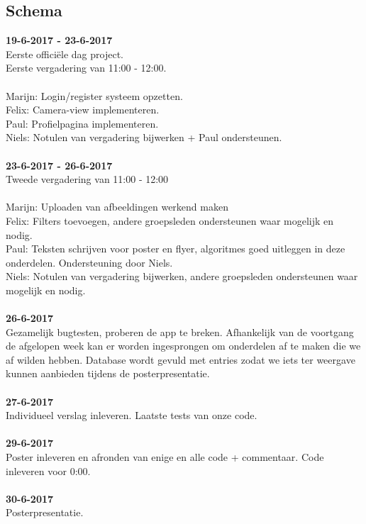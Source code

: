 \documentclass{uva-inf-article}
\begin{document}
\subsection{Schema}
\textbf{19-6-2017 - 23-6-2017}\\
Eerste offici\"ele dag project.\\
Eerste vergadering van 11:00 - 12:00.\\\\
Marijn: \space\space Login/register systeem opzetten.\\
Felix: \space\space\space\space Camera-view implementeren.\\
Paul: \space\space\space\space Profielpagina implementeren.\\
Niels: \space\space\space\space Notulen van vergadering bijwerken + Paul ondersteunen.\\
\\
\noindent
\textbf{23-6-2017 - 26-6-2017}\\
Tweede vergadering van 11:00 - 12:00\\\\
Marijn: \space\space Uploaden van afbeeldingen werkend maken\\
Felix: \space\space\space\space Filters toevoegen, andere groepsleden ondersteunen waar mogelijk en nodig.\\
Paul: \space\space\space\space Teksten schrijven voor poster en flyer, algoritmes goed uitleggen in deze onderdelen. Ondersteuning door Niels.\\
Niels: \space\space\space\space Notulen van vergadering bijwerken, andere groepsleden ondersteunen waar mogelijk en nodig.\\
\\
\noindent
\textbf{26-6-2017}\\
Gezamelijk bugtesten, proberen de app te breken. Afhankelijk van de voortgang de afgelopen week kan er worden ingesprongen om onderdelen af te maken die we af wilden hebben. Database wordt gevuld met entries zodat we iets ter weergave kunnen aanbieden tijdens de posterpresentatie.
\\\\
\noindent
\textbf{27-6-2017}\\
Individueel verslag inleveren. Laatste tests van onze code.
\\\\
\noindent
\textbf{29-6-2017}\\
Poster inleveren en afronden van enige en alle code + commentaar. Code inleveren voor 0:00.
\\\\
\noindent
\textbf{30-6-2017}\\
Posterpresentatie.


\end{document}

